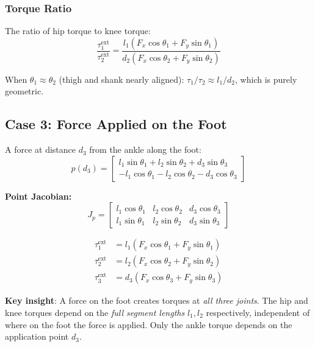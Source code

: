\documentclass[11pt,a4paper]{article}
\newcommand{\vc}[1]{\bm{#1}}
\def\vc#1{#1}%
\def\bm#1{#1}%
\begin{document}
\subsubsection*{Torque Ratio}

The ratio of hip torque to knee torque:
\begin{equation}
    \frac{\tau_1^{\text{ext}}}{\tau_2^{\text{ext}}}
    = \frac{l_1 (F_x \cos\theta_1 + F_y \sin\theta_1)}
           {d_2 (F_x \cos\theta_2 + F_y \sin\theta_2)}
    \label{eq:torque_ratio_shank}
\end{equation}

When $\theta_1 \approx \theta_2$ (thigh and shank nearly aligned):
$\tau_1/\tau_2 \approx l_1/d_2$, which is purely geometric.

\subsection{Case 3: Force Applied on the Foot}

A force at distance $d_3$ from the ankle along the foot:
\begin{equation}
    \vc{p}(d_3) = \begin{bmatrix}
        l_1 \sin\theta_1 + l_2 \sin\theta_2 + d_3 \sin\theta_3 \\
        -l_1 \cos\theta_1 - l_2 \cos\theta_2 - d_3 \cos\theta_3
    \end{bmatrix}
\end{equation}

\textbf{Point Jacobian:}
\begin{equation}
    \vc{J}_{p} = \begin{bmatrix}
        l_1 \cos\theta_1 & l_2 \cos\theta_2 & d_3 \cos\theta_3 \\
        l_1 \sin\theta_1 & l_2 \sin\theta_2 & d_3 \sin\theta_3
    \end{bmatrix}
    \label{eq:J_foot}
\end{equation}

\begin{resultbox}
\begin{align}
    \tau_1^{\text{ext}} &= l_1 (F_x \cos\theta_1 + F_y \sin\theta_1) \label{eq:tau1_foot} \\
    \tau_2^{\text{ext}} &= l_2 (F_x \cos\theta_2 + F_y \sin\theta_2) \label{eq:tau2_foot} \\
    \tau_3^{\text{ext}} &= d_3 (F_x \cos\theta_3 + F_y \sin\theta_3) \label{eq:tau3_foot}
\end{align}

\textbf{Key insight}: A force on the foot creates torques at
\textit{all three joints}. The hip and knee torques depend on the
\textit{full segment lengths} $l_1, l_2$ respectively, independent of where
on the foot the force is applied. Only the ankle torque depends on the
application point $d_3$.
\end{resultbox}
\end{document}
